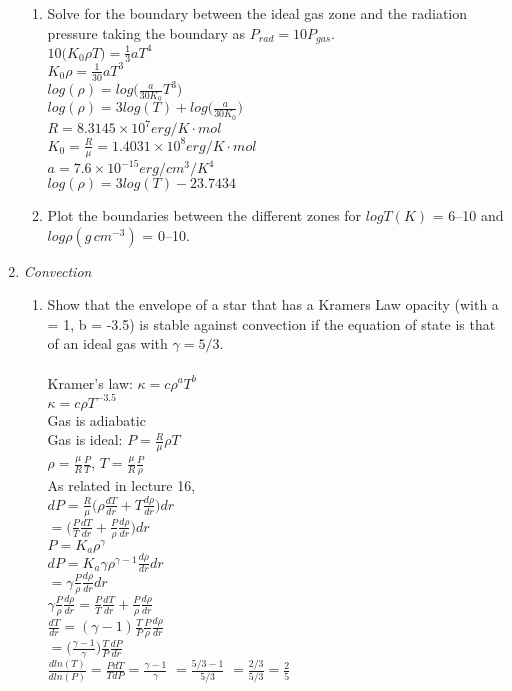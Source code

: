 \documentclass[]{article}
\begin{document}
\begin{enumerate}
{\begin{enumerate}
{	}
	\item{
		Solve for the boundary between the ideal gas zone and the radiation pressure taking the boundary as $P_{rad} = 10P_{gas}$.
		\\
		$10 \big(K_0\rho T\big) = \frac{1}{3}aT^4$
		\\
		$K_0 \rho = \frac{1}{30}aT^3$
		\\
		$log(\rho) = log\big(\frac{a}{30K_0}T^3\big)$
		\\
		$log(\rho) = 3log(T) + log\big(\frac{a}{30K_0}\big)$
		\\
		$R = 8.3145 \times 10^7 erg/K\cdot mol$
		\\
		$K_0 = \frac{R}{\mu} = 1.4031\times10^8 erg/K\cdot mol$
		\\
		$a = 7.6 \times 10^{-15} erg/cm^3/K^4$
		\\
		$log(\rho) = 3log(T) - 23.7434$
	}
	\item{
		Plot the boundaries between the different zones for $logT(K)$ = 6--10 and $log\rho(g\, cm^{-3})$ = 0--10.
	}
	\end{enumerate}
}
\item{
	\textit{Convection}
	\begin{enumerate}
	\item{
		Show that the envelope of a star that has a Kramers Law opacity (with a = 1, b = -3.5) is
stable against convection if the equation of state is that of an ideal gas with $\gamma = 5/3$.
		\\\\
		Kramer's law: $\kappa = c\rho^a T^b$
		\\
		$\kappa = c\rho T^{-3.5}$
		\\
		Gas is adiabatic 
		\\
		Gas is ideal: $P = \frac{R}{\mu}\rho T$
		\\
		$\rho = \frac{\mu}{R}\frac{P}{T}$,
		$T = \frac{\mu}{R}\frac{P}{\rho}$
		\\
		As related in lecture 16,
		\\
		$dP = \frac{R}{\mu}\big(\rho\frac{dT}{dr} + T\frac{d\rho}{dr}\big)dr$
		\\
		$ = \big(\frac{P}{T}\frac{dT}{dr} + \frac{P}{\rho}\frac{d\rho}{dr}\big)dr$
		\\
		$P = K_a\rho^{\gamma}$
		\\
		$dP = K_a \gamma \rho^{\gamma -1}\frac{d\rho}{dr}dr$
		\\
		$= \gamma \frac{P}{\rho}\frac{d\rho}{dr}dr$
		\\
		$ \gamma \frac{P}{\rho}\frac{d\rho}{dr} = \frac{P}{T}\frac{dT}{dr} + \frac{P}{\rho}\frac{d\rho}{dr}$
		\\
		$\frac{dT}{dr} = (\gamma -1) \frac{T}{P}\frac{P}{\rho}\frac{d\rho}{dr}$
		\\
		$= \big(\frac{\gamma -1}{\gamma}\big) \frac{T}{P}\frac{dP}{dr}$
		\\
		$\frac{dln(T)}{dln(P)} = \frac{PdT}{TdP} = \frac{\gamma -1}{\gamma}	$
		$= \frac{5/3 -1}{5/3}$
		$= \frac{2/3}{5/3} = \frac{2}{5}$ 
		
}
\end{enumerate}}
\end{enumerate}
\end{document}
